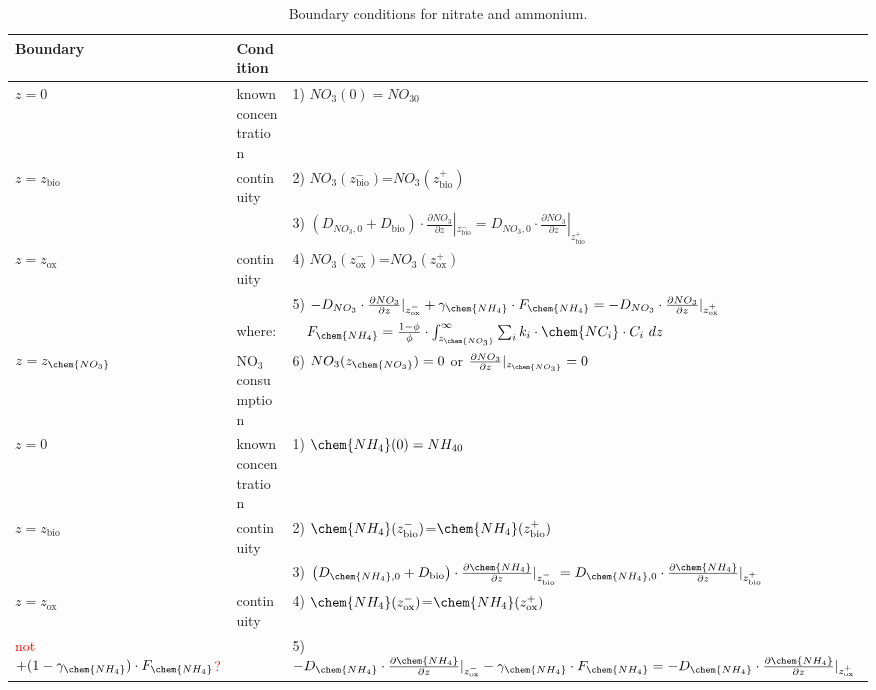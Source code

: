 \documentclass[gmd, manuscript]{copernicus}
\begin{document}
\begin{table}[tbp]
\caption{Boundary conditions for nitrate and ammonium.}
\centering
\begin{tabular}{ |l| l| l|}
\hline
\textbf{Boundary}& \textbf{Condition}&\\
\hline
$z=0$& known concentration& 1) $NO_3(0)=NO_{30}$  \\
$z=z_{\mathrm{bio}}$&continuity& 2) $NO_3(z_{\mathrm{bio}}^-)$=$NO_3(z_{\mathrm{bio}}^+)$\\
               && 3) $\left(D_{NO_3,0}+D_{\mathrm{bio}}\right )\cdot \frac{\partial NO_3}{\partial z}|_{z_{\mathrm{bio}}^-}=D_{NO_3,0} \cdot \frac{\partial NO_3}{\partial z}|_{z_{\mathrm{bio}}^+}$\\
$z=z_{\mathrm{ox}}$& continuity& 4) $NO_3(z_{\mathrm{ox}}^-)$=$NO_3(z_{\mathrm{ox}}^+)$\\
               && 5) $-D_{NO_3} \cdot \frac{\partial NO_3}{\partial z}|_{z_{\mathrm{ox}}^-} + \gamma_{\chem{NH_4}}\cdot F_{\chem{NH_4}}=-D_{NO_3} \cdot \frac{\partial NO_3}{\partial z}|_{z_{\mathrm{ox}}^+}$\\
&where: & $\quad F_{\chem{NH_4}}=\frac{1-\phi}{\phi} \cdot \int_{z_{\chem{NO_3}}}^{\infty}  \sum_i k_i \cdot \chem{NC_i} \cdot C_i\ dz$ \\          
$z=z_{\chem{NO_3}}$& NO$_3$ consumption & 6) $NO_3(z_{\chem{NO_3}})=0$ \quad or \quad $\frac{\partial NO_3}{\partial z}|_{z_{\chem{NO_3}}}=0$\\
\hline
$z=0$& known concentration& 1) $\chem{NH_4}(0)=NH_{40}$  \\
$z=z_{\mathrm{bio}}$&continuity& 2) $\chem{NH_4}(z_{\mathrm{bio}}^-)$=$\chem{NH_4}(z_{\mathrm{bio}}^+)$\\
               && 3) $\left(D_{\chem{NH_4},0}+D_{\mathrm{bio}}\right )\cdot \frac{\partial \chem{NH_4}}{\partial z}|_{z_{\mathrm{bio}}^-}=D_{\chem{NH_4},0} \cdot \frac{\partial \chem{NH_4}}{\partial z}|_{z_{\mathrm{bio}}^+}$\\
$z=z_{\mathrm{ox}}$& continuity& 4) $\chem{NH_4}(z_{\mathrm{ox}}^-)$=$\chem{NH_4}(z_{\mathrm{ox}}^+)$\\
    \textcolor{red}{not $+(1-\gamma_{\chem{NH_4}})\cdot F_{\chem{NH_4}}$?}           && 5) $-D_{\chem{NH_4}} \cdot \frac{\partial \chem{NH_4}}{\partial z}|_{z_{\mathrm{ox}}^-} -\gamma_{\chem{NH_4}}\cdot F_{\chem{NH_4}}=-D_{\chem{NH_4}} \cdot \frac{\partial \chem{NH_4}}{\partial z}|_{z_{\mathrm{ox}}^+}$\\

\end{tabular}
\end{table}
\end{document}
